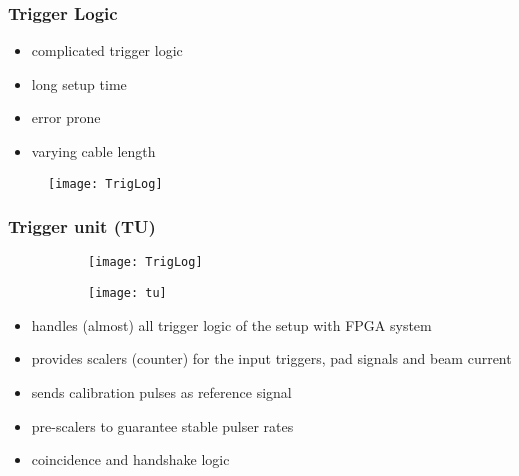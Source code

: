 \begin{frame}
	\frametitle{Trigger Logic}
	\begin{minipage}[c][.5\textheight]{4cm}
		\begin{itemize}
			\setlength{\itemsep}{\fill}
			\item complicated trigger logic
			\item long setup time
			\item error prone
			\item varying cable length
		\end{itemize}
	\end{minipage}
	\begin{minipage}{8cm}
		\begin{figure}
			\centering
			\texttt{[image: TrigLog]}
		\end{figure}
	\end{minipage}
\end{frame}
\begin{frame}
	\frametitle{Trigger unit (TU)}
	\begin{figure}
		\centering
		\begin{subfigure}[t]{0.2\textwidth}
			\centering
			\texttt{[image: TrigLog]}
		\end{subfigure}
		\ra
		\begin{subfigure}[t]{0.7\textwidth}
			\centering
			\texttt{[image: tu]}
		\end{subfigure}
	\end{figure}
	\begin{itemize}
		\setlength{\itemsep}{\fill}
		\item handles (almost) all trigger logic of the setup with FPGA system
		\item provides scalers (counter) for the input triggers, pad signals and beam current
		\item sends calibration pulses as reference signal
		\item pre-scalers to guarantee stable pulser rates
		\item coincidence and handshake logic
	\end{itemize}
\end{frame}